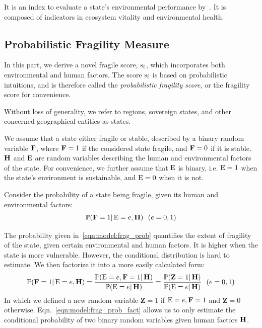  It is an index to evaluate a state's environmental performance by~. It is composed of indicators in ecosystem vitality and environmental health. 

\subsection{Probabilistic Fragility Measure}
\label{sec:model:frag}
In this part, we derive a novel fragile score, $\operatorname*{s_f}$, which incorporates both environmental and human factors. The score $\operatorname*{s_f}$ is based on probabilistic intuitions, and is therefore called the \emph{probabilistic fragility score}, or the fragility score for convenience.

Without loss of generality, we refer to regions, sovereign states, and other concerned geographical entities as states.

We assume that a state either fragile or stable, described by a binary random variable $\operatorname*{\mathbf{F}}$, where $\operatorname*{\mathbf{F}}=1$ if the considered state fragile, and $\operatorname*{\mathbf{F}}=0$ if it is stable. $\operatorname*{\mathbf{H}}$ and $\operatorname*{E}$ are random variables describing the human and environmental factors of the state. For convenience, we further assume that $\operatorname*{E}$ is binary, i.e. $\operatorname*{E}=1$ when the state's environment is sustainable, and $\operatorname*{E}=0$ when it is not. 

Consider the probability of a state being fragile, given its human and environmental factors:
\begin{equation}
    \mathbb P{(\operatorname*{\mathbf{F}}=1|\operatorname*{E}=e, \operatorname*{\mathbf{H}})} \ \ (e=0,1)
\label{eqn:model:frag_prob}
\end{equation}

The probability given in~\ref{eqn:model:frag_prob} quantifies the extent of fragility of the state, given certain environmental and human factors. It is higher when the state is more vulnerable. However, the conditional distribution is hard to estimate. We then factorize it into a more easily calculated form: 
\begin{equation}
    \mathbb P(\operatorname*{\mathbf{F}}=1|\operatorname*{E}=e,\operatorname*{\mathbf{H}})= \frac{\mathbb P(\operatorname*{E}=e, \operatorname*{\mathbf{F}}=1 | \operatorname*{\mathbf{H}})}{\mathbb P(\operatorname*{E}=e | \operatorname*{\mathbf{H}})} = \frac{\mathbb P(\mathbf{Z}=1|\operatorname*{\mathbf{H}})}{\mathbb P(\operatorname*{E}=e|\operatorname*{\mathbf{H}})}\ \ (e = 0,1)
    \label{eqn:model:frag_prob_fact}
\end{equation}
In which we defined a new random variable $\mathbf{Z}=1$ if $\operatorname*{E}=e,\operatorname*{\mathbf{F}}=1$ and $\mathbf{Z}=0$ otherwise.
Eqn.~\ref{eqn:model:frag_prob_fact} allows us to only estimate the conditional probability of two binary random variables given human factors $\operatorname*{\mathbf{H}}$.

